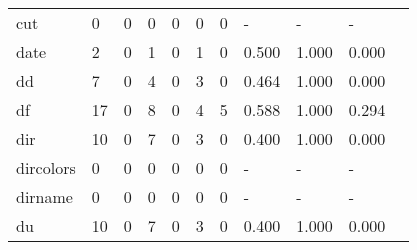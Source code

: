 \begin{longtable}{lp{1.10cm}p{1.10cm}p{1.10cm}p{1.10cm}p{1.10cm}p{1.10cm}p{1.10cm}p{1.10cm}p{1.10cm}p{1.10cm}}
cut       &                      0 &                                  0 &                                 0 &                                0 &                                 0 &                               0 &                              - &                                     - &                                   - \\
date      &                      2 &                                  0 &                                 1 &                                0 &                                 1 &                               0 &                          0.500 &                                 1.000 &                               0.000 \\
dd        &                      7 &                                  0 &                                 4 &                                0 &                                 3 &                               0 &                          0.464 &                                 1.000 &                               0.000 \\
df        &                     17 &                                  0 &                                 8 &                                0 &                                 4 &                               5 &                          0.588 &                                 1.000 &                               0.294 \\
dir       &                     10 &                                  0 &                                 7 &                                0 &                                 3 &                               0 &                          0.400 &                                 1.000 &                               0.000 \\
dircolors &                      0 &                                  0 &                                 0 &                                0 &                                 0 &                               0 &                              - &                                     - &                                   - \\
dirname   &                      0 &                                  0 &                                 0 &                                0 &                                 0 &                               0 &                              - &                                     - &                                   - \\
du        &                     10 &                                  0 &                                 7 &                                0 &                                 3 &                               0 &                          0.400 &                                 1.000 &                               0.000 \\

\end{longtable}

